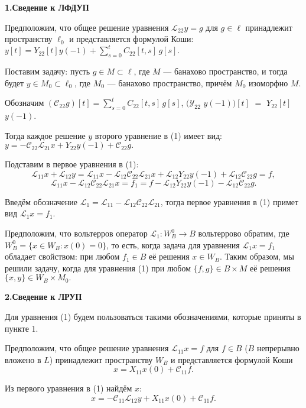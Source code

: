 \smallskip \centerline {\bf 1.Сведение к ЛФДУП} \nopagebreak

Предположим, что общее решение уравнения ${\mathcal L}_{22} y=g$ для $g\in \ell $ принадлежит пространству $\ell _{0} $ и представляется формулой Коши:
$y[t]=Y_{22} [t]y(-1)+\sum\limits_{s=0}^{t}
 C_{22} [t,s]\, g[s].$

Поставим задачу: пусть $g\in M\subset \ell $, где $M$ --- банахово пространство, и тогда будет $y\in M_{0} \subset \ell _{0} $, где $M_{0} $ --- банахово пространство, причём $M_{0} $ изоморфно $M$.

Обозначим $({\mathcal C}_{22} g)[t]=\sum\limits_{s=0}^{t}C_{22} [t,s]\,g[s]$, $({\mathcal Y}_{22}$ $y(-1))[t]$ $=$ $Y_{22}[t]$$y(-1)$.

Тогда каждое решение $y$ второго уравнение в (1) имеет вид:
$y=-{\mathcal C}_{22} {\mathcal L}_{21} x+Y_{22} y(-1)+{\mathcal C}_{22} g.$

Подставим в первое уравнения в (1):
$${\mathcal L}_{11} x+{\mathcal L}_{12} y= {\mathcal L}_{11} x- {\mathcal L}_{12} {\mathcal C}_{22} {\mathcal L}_{21} x+{\mathcal L}_{12} Y_{22} y(-1)+ {\mathcal L}_{12} {\mathcal C}_{22} g=f,
$$
$$ {\mathcal L}_{11} x- {\mathcal L}_{12} {\mathcal C}_{22} {\mathcal L}_{21} x=f_{1} =f- {\mathcal L}_{12} Y_{22} y(-1)-{\mathcal L}_{ 12} {\mathcal C}_{22} g.
$$

Введём обозначение ${\mathcal L}_1= {\mathcal L}_{11} - {\mathcal L}_{12} {\mathcal C}_{22} {\mathcal L}_{21}$, тогда первое уравнения в (1) примет вид ${\mathcal L}_1x=f_{1}$.

Предположим, что вольтерров оператор ${\mathcal L}_1:W_{B}^{0} \to B$ вольтеррово обратим, где $W_{B}^{0} =\{ x\in W_{B} :x(0)=0\} $, то есть, когда задача для уравнения ${\mathcal L}_1x=f_{1} $ обладает свойством: при любом $f_{1} \in B$ её решения $x\in W_{B} $. Таким образом, мы решили задачу, когда для уравнения (1) при любом $\{ f,g\} \in B\times M$ её решения $\{ x,y\} \in W_{B} \times M_{0} .$



\smallskip \centerline {\bf 2.Сведение к ЛРУП} \nopagebreak


Для уравнения (1) будем пользоваться такими обозначениями, которые приняты в пункте 1.

Предположим, что общее решение уравнения ${\mathcal L}_{11} x=f$ для $f\in B$ ($B$ непрерывно вложено в $L$) принадлежит пространству $W_{B}$ и представляется формулой Коши
$$x = X_{11}x(0) + {\mathcal C}_{11}f.$$

Из первого уравнения в (1) найдём $x:$
$$x=-{\mathcal C}_{11} {\mathcal L}_{12} y+X_{11} x(0)+{\mathcal C}_{11} f.$$

